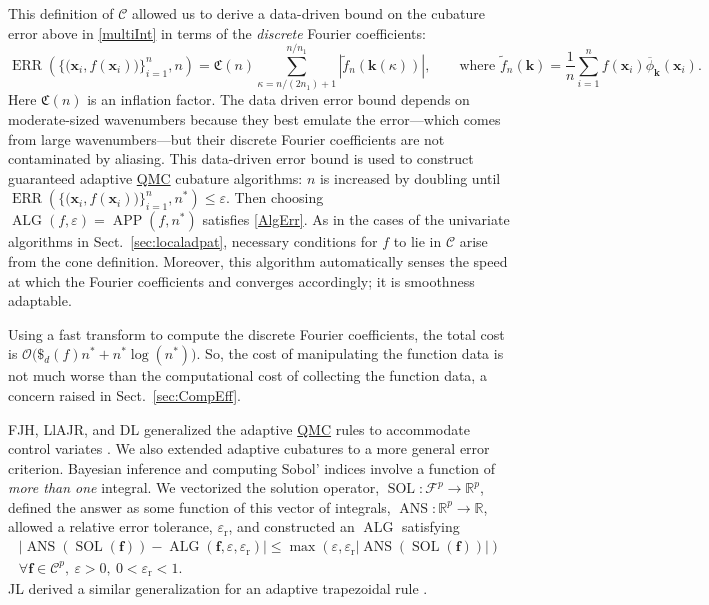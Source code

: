 \documentclass[11pt]{NSFamsart}
\newcommand{\QMC}{\hyperlink{QMClink}{QMC}\xspace}
\newcommand{\tf}{\widetilde{f}}
\newcommand{\reals}{{\mathbb{R}}}
\newcommand{\vf}{\boldsymbol{f}}
\DeclareMathOperator{\Ans}{ANS}
\DeclareMathOperator{\SOL}{SOL}
\DeclareMathOperator{\APP}{APP}
\DeclareMathOperator{\ALG}{ALG}
\DeclareMathOperator{\ERR}{ERR}
\newcommand{\bx}{{\boldsymbol{x}}}
\newcommand{\bk}{{\boldsymbol{k}}}
\newcommand{\cc}{\mathcal{C}}
\newcommand{\calc}{{\mathcal{C}}}
\newcommand{\calf}{{\mathcal{F}}}
\newcommand{\fC}{\mathfrak{C}}
\def\abs#1{\ensuremath{\left \lvert #1 \right \rvert}}
\newcommand{\Order}{\mathcal{O}}
\newcommand{\reltol}{\varepsilon_{\text{r}}}
\newcommand{\dataN}{\bigl\{\bigl(\bx_i,f(\bx_i)\bigr)\bigr\}_{i=1}^n}
\begin{document}
This definition  of $\cc$ allowed us to derive a data-driven bound on the cubature error above in \eqref{multiInt} in terms of the \emph{discrete} Fourier coefficients: 
\begin{equation*}
\ERR(\dataN,n) = \fC(n) \sum_{\kappa = n/(2n_1) + 1}^{n/n_1} \abs{\tf_n(\bk(\kappa))}, \qquad \text{where } \tf_n(\bk)  = \frac{1}n \sum_{i=1}^{n} f(\bx_i) \overline{\phi}_{\bk}(\bx_i).
\end{equation*}
Here $\fC(n)$ is an inflation factor.  The data driven error bound depends on moderate-sized wavenumbers because they best emulate the error---which comes from large wavenumbers---but their discrete Fourier coefficients are not contaminated by aliasing. This data-driven error bound is used to construct guaranteed adaptive \QMC cubature 
algorithms: $n$ is increased by doubling until $\ERR(\dataN,n^*) \le \varepsilon$.  Then choosing 
$\ALG(f,\varepsilon) = \APP(f,n^*)$ satisfies 
\eqref{AlgErr}.  As in the cases of the univariate algorithms in Sect.\ \ref{sec:localadpat}, necessary conditions for $f$ to lie in $\calc$ arise from the cone definition.  Moreover, this algorithm automatically senses the speed at which the Fourier coefficients and converges accordingly; it is smoothness adaptable.

Using a fast transform to compute the discrete Fourier coefficients, the total cost is $\Order\bigl(\$_d(f)n^* + n^* \log(n^*)\bigr)$.  So, the cost of manipulating the function data is not much worse than the computational cost of collecting the function data, a concern raised in Sect.\ \ref{sec:CompEff}.

FJH, LlAJR, and DL generalized the adaptive \QMC rules to accommodate control variates \cite{HicEtal17a}.  We also extended adaptive cubatures to a more general error criterion.  Bayesian inference \cite{GelEtal13} and computing Sobol' indices \cite{Sal02a} involve a function of \emph{more than one} integral. We vectorized the solution operator, $\SOL : \calf^p \to \reals^p$, defined the answer as some function of this vector of integrals, $\Ans: \reals^p \to \reals$, allowed a relative error tolerance, $\reltol$, and constructed an $\ALG$ satisfying
\begin{multline}
\label{generrorcrit} \tag{G-ALG-CRIT}
\abs{\Ans(\SOL(\vf)) - \ALG(\vf,\varepsilon, \reltol) } \le \max(\varepsilon, \reltol \abs{\Ans(\SOL(\vf))} ) \\
\forall \vf \in \cc^p, \ \varepsilon > 0, \ 0 < \reltol < 1 .
\end{multline}
JL derived a similar generalization for an adaptive trapezoidal rule \cite{Liu17a}.
\end{document}
